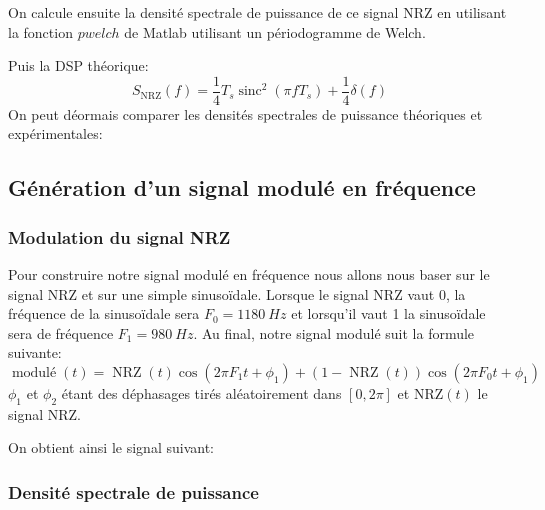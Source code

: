 \documentclass{article}
\newcommand{\sinc}{\operatorname{sinc}}
\begin{document}
On calcule ensuite la densité spectrale de puissance de ce signal NRZ en utilisant la fonction $pwelch$ de Matlab utilisant un périodogramme de Welch.

Puis la DSP théorique: 
\[
S_\text{NRZ}(f)=\frac{1}{4} T_s \sinc^2(\pi f T_s)+\frac{1}{4} \delta(f)
\]
On peut déormais comparer les densités spectrales de puissance théoriques et expérimentales:




\subsection{Génération d'un signal modulé en fréquence}

\subsubsection{Modulation du signal NRZ}

Pour construire notre signal modulé en fréquence nous allons nous baser sur le signal NRZ et sur une simple sinusoïdale. Lorsque le signal NRZ vaut 0, la fréquence de la sinusoïdale sera $F_0=\SI{1180}{Hz}$ et lorsqu'il vaut 1 la sinusoïdale sera de fréquence $F_1=\SI{980}{Hz}$. Au final, notre signal modulé suit la formule suivante:
\[
\operatorname{modulé}(t)=\operatorname{NRZ}(t) \cos(2\pi F_1 t + \phi_1) + (1-\operatorname{NRZ}(t)) \cos(2 \pi F_0 t + \phi_1)
\]
$\phi_1$ et $\phi_2$ étant des déphasages tirés aléatoirement dans $[0, 2\pi]$ et $\text{NRZ}(t)$ le signal NRZ.


On obtient ainsi le signal suivant:



\subsubsection{Densité spectrale de puissance}
\end{document}
